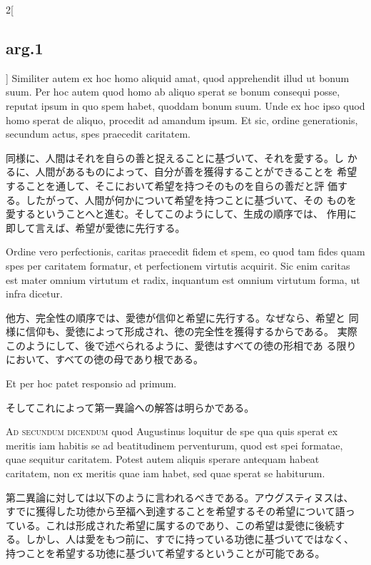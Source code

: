 \documentclass[paper=a4paper,fontsize=10pt,jafontsize=9pt,titlepage]{jlreq}
\begin{document}
\begin{paracol}{2}[\subsection{arg.1}]
Similiter autem ex hoc homo aliquid amat, quod apprehendit illud ut
 bonum suum. Per hoc autem quod homo ab aliquo sperat se bonum
 consequi posse, reputat ipsum in quo spem habet, quoddam bonum
 suum. Unde ex hoc ipso quod homo sperat de aliquo, procedit ad
 amandum ipsum. Et sic, ordine generationis, secundum actus, spes
 praecedit caritatem.

\switchcolumn

同様に、人間はそれを自らの善と捉えることに基づいて、それを愛する。し
 かるに、人間があるものによって、自分が善を獲得することができることを
 希望することを通して、そこにおいて希望を持つそのものを自らの善だと評
 価する。したがって、人間が何かについて希望を持つことに基づいて、その
 ものを愛するということへと進む。そしてこのようにして、生成の順序では、
 作用に即して言えば、希望が愛徳に先行する。

\switchcolumn*

Ordine vero perfectionis, caritas praecedit fidem et spem, eo quod
 tam fides quam spes per caritatem formatur, et perfectionem virtutis
 acquirit. Sic enim caritas est mater omnium virtutum et radix,
 inquantum est omnium virtutum forma, ut infra dicetur.

\switchcolumn

他方、完全性の順序では、愛徳が信仰と希望に先行する。なぜなら、希望と
 同様に信仰も、愛徳によって形成され、徳の完全性を獲得するからである。
 実際このようにして、後で述べられるように、愛徳はすべての徳の形相であ
 る限りにおいて、すべての徳の母であり根である。

\switchcolumn*

Et per hoc patet responsio ad primum.

\switchcolumn

そしてこれによって第一異論への解答は明らかである。

\switchcolumn*[\subsection{ad.2}]

{\scshape Ad secundum dicendum} quod Augustinus loquitur de spe qua
quis sperat ex meritis iam habitis se ad beatitudinem perventurum,
quod est spei formatae, quae sequitur caritatem. Potest autem aliquis
sperare antequam habeat caritatem, non ex meritis quae iam habet, sed
quae sperat se habiturum.

\switchcolumn

第二異論に対しては以下のように言われるべきである。アウグスティヌスは、
 すでに獲得した功徳から至福へ到達することを希望するその希望について語っ
 ている。これは形成された希望に属するのであり、この希望は愛徳に後続す
 る。しかし、人は愛をもつ前に、すでに持っている功徳に基づいてではなく、
 持つことを希望する功徳に基づいて希望するということが可能である。


\end{paracol}
\end{document}
